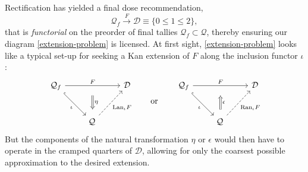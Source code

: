 \documentclass{article}
\newcommand{\D}{\ensuremath{\mathcal{D}}}
\newcommand{\Q}{\ensuremath{\mathcal{Q}}}
\begin{document}
Rectification has yielded a final dose recommendation,
$$
\Q_f \xrightarrow{F} \D \equiv \{0 \le 1 \le 2\},
$$
that is {\em functorial} on the preorder of final tallies $\Q_f \subset \Q$, thereby ensuring our diagram \eqref{extension-problem} is licensed.  At first sight, \eqref{extension-problem} looks like a typical set-up for seeking a Kan extension of $F$ along the inclusion functor $\iota$:
\begin{equation}\label{Kan-nope}
  \begin{tikzcd}[row sep=large]
    \Q_f \ar[dr,hook,"\iota"'] \ar[rr,"F"{name=F},""{name=U,below}] & & \D \\
    & \Q\, \ar[ur,dashed,"\text{Lan}_\iota F"']
      \ar[Rightarrow,shorten=2.5mm,from=U,"\eta"]
  \end{tikzcd}
  \quad\quad\text{or}\quad\quad
  \begin{tikzcd}[row sep=large]
    \Q_f \ar[dr,hook,"\iota"'] \ar[rr,"F"{name=F},""{name=U,below}] & & \D \\
    & \Q\, \ar[ur,dashed,"\text{Ran}_\iota F"']
      \ar[Rightarrow,shorten=2.5mm,to=U,"\epsilon"']
  \end{tikzcd}
\end{equation}
But the components of the natural transformation $\eta$ or $\epsilon$ would then have to operate in the cramped quarters of $\D$, allowing for only the coarsest possible approximation to the desired extension.
\end{document}
